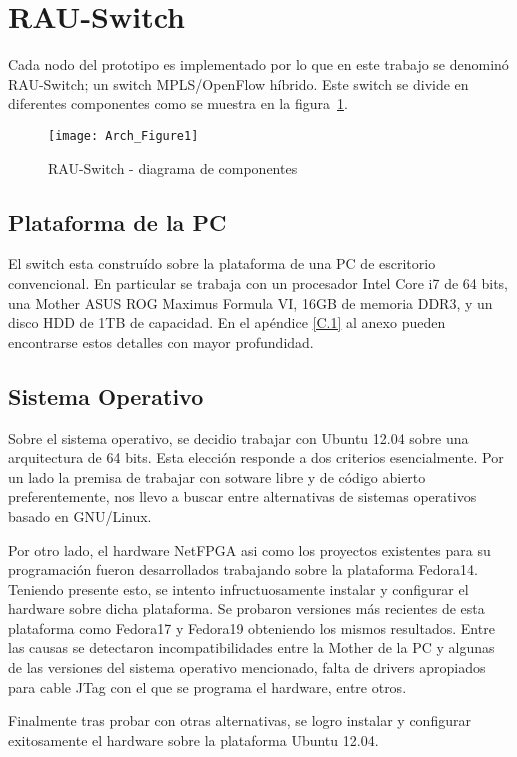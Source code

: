 \section{RAU-Switch}
Cada nodo del prototipo es implementado por lo que en este trabajo se denomin\'o RAU-Switch; un switch MPLS/OpenFlow híbrido. Este switch se divide en diferentes componentes como se muestra en la figura~\ref{fig:OpenSourceRArch}.

\newpage
\begin{figure}[htbp!] 
\centering    
\texttt{[image: Arch\_Figure1]}
\caption[RAU-Switch - diagrama de componentes]{RAU-Switch - diagrama de componentes}
\label{fig:OpenSourceRArch}
\end{figure}


\subsection{Plataforma de la PC}
El switch esta constru\'ido sobre la plataforma de una PC de escritorio convencional. En particular se trabaja con un procesador Intel Core i7 de 64 bits, una Mother ASUS ROG Maximus Formula VI, 16GB de memoria DDR3, y un disco HDD de 1TB de capacidad. En el apéndice \ref{C.1} al anexo pueden encontrarse estos detalles con mayor profundidad.

\subsection{Sistema Operativo}
Sobre el sistema operativo, se decidio trabajar con Ubuntu 12.04 sobre una arquitectura de 64 bits. Esta elecci\'on responde a dos criterios esencialmente. Por un lado la premisa de trabajar con sotware libre y de c\'odigo abierto preferentemente, nos llevo a buscar entre alternativas de sistemas operativos basado en GNU/Linux.

Por otro lado, el hardware NetFPGA asi como los proyectos existentes para su programaci\'on fueron desarrollados trabajando sobre la plataforma Fedora14. Teniendo presente esto, se intento infructuosamente instalar y configurar el hardware sobre dicha plataforma. Se probaron versiones m\'as recientes de esta plataforma como Fedora17 y Fedora19 obteniendo los mismos resultados. Entre las causas se detectaron incompatibilidades entre la Mother de la PC y algunas de las versiones del sistema operativo mencionado, falta de drivers apropiados para cable JTag con el que se programa el hardware, entre otros.

Finalmente tras probar con otras alternativas, se logro instalar y configurar exitosamente el hardware sobre la plataforma Ubuntu 12.04.\\

